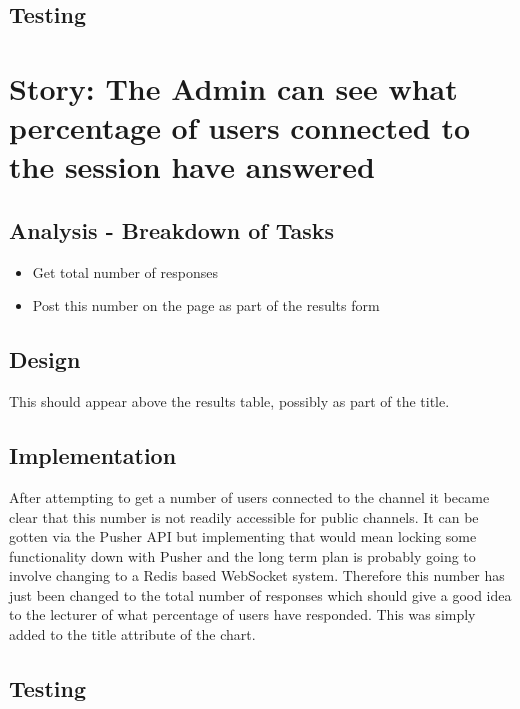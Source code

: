 \documentclass{article}
\begin{document}
\subsection{Testing}
\newpage

\section{Story: The Admin can see what percentage of users connected to the session have answered}
\subsection{Analysis - Breakdown of Tasks}
\begin{itemize}
	\item Get total number of responses
	\item Post this number on the page as part of the results form
\end{itemize}
\subsection{Design}
This should appear above the results table, possibly as part of the title.
\subsection{Implementation}
After attempting to get a number of users connected to the channel it became clear that this number is not readily accessible for public channels. It can be gotten via the Pusher API but implementing that would mean locking some functionality down with Pusher and the long term plan is probably going to involve changing to a Redis based WebSocket system. Therefore this number has just been changed to the total number of responses which should give a good idea to the lecturer of what percentage of users have responded. This was simply added to the title attribute of the chart.
\subsection{Testing}
\newpage

%
%
\end{document}
